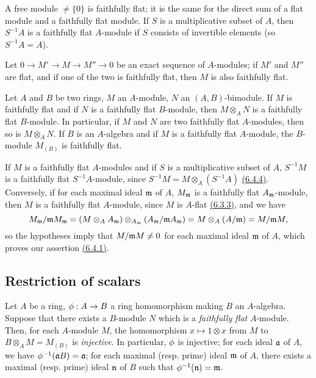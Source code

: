 \begin{env}[6.4.2]
\label{0.6.4.2}
A free module $\neq\{0\}$ is faithfully flat; it is the same for the direct sum of a flat
module and a faithfully flat module. If $S$ is a multiplicative subset of $A$, then
$S^{-1}A$ is a faithfully flat $A$-module if $S$ consists of invertible elements
(so $S^{-1}A=A$).
\end{env}

\begin{env}[6.4.3]
\label{0.6.4.3}
Let $0\to M'\to M\to M''\to 0$ be an exact sequence of $A$-modules; if $M'$ and $M''$ are
flat, and if one of the two is faithfully flat, then $M$ is also faithfully flat.
\end{env}

\begin{env}[6.4.4]
\label{0.6.4.4}
Let $A$ and $B$ be two rings, $M$ an $A$-module, $N$ an $(A,B)$-bimodule. If $M$ is
faithfully flat and if $N$ is a faithfully flat $B$-module, then $M\otimes_A N$ is a
faithfully flat $B$-module. In particular, if $M$ and $N$ are two faithfully flat
$A$-modules, then so is $M\otimes_A N$. If $B$ is an $A$-algebra and if $M$ is a faithfully
flat $A$-module, the $B$-module $M_{(B)}$ is faithfully flat.
\end{env}

\begin{env}[6.4.5]
\label{0.6.4.5}
If $M$ is a faithfully flat $A$-modules and if $S$ is a multiplicative subset of $A$,
$S^{-1}M$ is a faithfully flat $S^{-1}A$-module, since $S^{-1}M=M\otimes_A(S^{-1}A)$
\hyperref[0.6.4.4]{(6.4.4)}. Conversely, if for each maximal ideal $\mathfrak{m}$ of $A$,
$M_\mathfrak{m}$ is a faithfully flat $A_\mathfrak{m}$-module, then $M$ is a faithfully flat
$A$-module, since $M$ is $A$-flat \hyperref[0.6.3.3]{(6.3.3)}, and we have
\[
  M_\mathfrak{m}/\mathfrak{m}M_\mathfrak{m}
  =(M\otimes_A A_\mathfrak{m})
  \otimes_{A_\mathfrak{m}}(A_\mathfrak{m}/\mathfrak{m}A_\mathfrak{m})
  =M\otimes_A(A/\mathfrak{m})=M/\mathfrak{m}M,
\]
so the hypotheses imply that $M/\mathfrak{m}M\neq 0$ for each maximal ideal $\mathfrak{m}$ of
$A$, which proves our assertion \hyperref[0.6.4.1]{(6.4.1)}.
\end{env}

\subsection{Restriction of scalars}
\label{subsection-restriction-of-scalars}

\begin{env}[6.5.1]
\label{0.6.5.1}
Let $A$ be a ring, $\phi:A\to B$ a ring homomorphism making $B$ an $A$-algebra. Suppose that
there exists a $B$-module $N$ which is a {\em faithfully flat} $A$-module. Then, for each
$A$-module $M$, the homomorphism $x\mapsto 1\otimes x$ from $M$ to $B\otimes_A M=M_{(B)}$ is
{\em injective}. In particular, $\phi$ is injective; for each ideal $\mathfrak{a}$ of $A$,
we have $\phi^{-1}(\mathfrak{a}B)=\mathfrak{a}$; for each maximal (resp. prime) ideal
$\mathfrak{m}$ of $A$, there exists a maximal (resp. prime) ideal $\mathfrak{n}$ of $B$ such
that $\phi^{-1}(\mathfrak{n})=\mathfrak{m}$.
\end{env}

